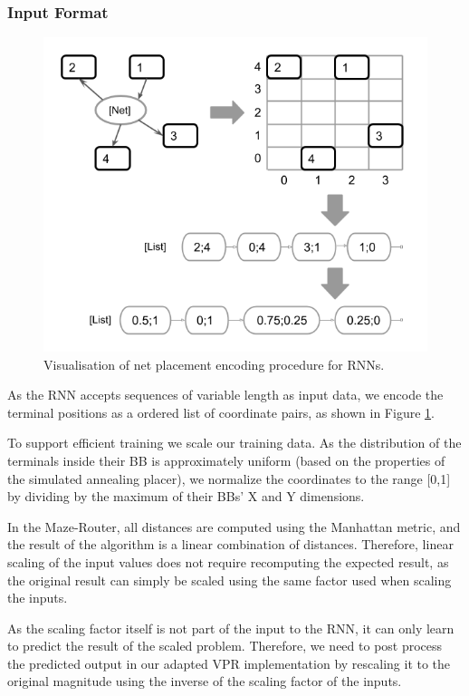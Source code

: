 \subsubsection{Input Format}

\begin{figure}
	\includegraphics[width=\linewidth]{plots/rnn-encoding-proper.png}
	\caption{Visualisation of net placement encoding procedure for \glspl{RNN}.}
	\label{fig:rnn-encoding}
\end{figure}

As the \gls{RNN} accepts sequences of variable length as input data, we encode the terminal positions as a ordered list of coordinate pairs, as shown in Figure \ref{fig:rnn-encoding}.

To support efficient training we scale our training data. As the distribution of the terminals inside their \gls{BB} is approximately uniform (based on the properties of the simulated annealing placer), we normalize the coordinates to the range [0,1] by dividing by the maximum of their \glspl{BB}' X and Y dimensions. 

In the Maze-Router, all distances are computed using the Manhattan metric, and the result of the algorithm is a linear combination of distances. Therefore, linear scaling of the input values does not require recomputing the expected result, as the original result can simply be scaled using the same factor used when scaling the inputs.

As the scaling factor itself is not part of the input to the \gls{RNN}, it can only learn to predict the result of the scaled problem. Therefore, we need to post process the predicted output in our adapted \gls{VPR} implementation by rescaling it to the original magnitude using the inverse of the scaling factor of the inputs.

